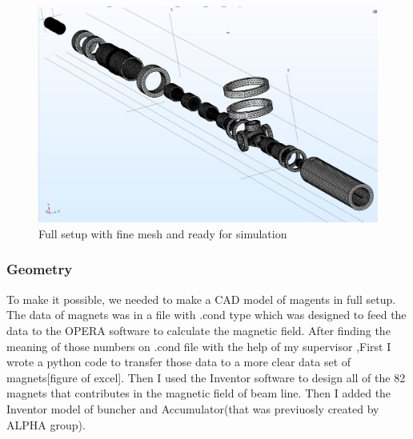 \documentclass[12pt,a4paper]{article}
\begin{document}
\begin{figure}[h]
\centering
\includegraphics[scale=0.4]{full-mesh}
\caption{Full setup with fine mesh and ready for simulation}
\end{figure}

\subsubsection{Geometry}
To make it possible, we needed to make a CAD model of magents in full setup. The data of magnets was in a file with .cond type which was designed to feed the data to the OPERA software to calculate the magnetic field. After finding the meaning of those numbers on .cond file with the help of my supervisor ,First I wrote a python code to transfer those data to a more clear data set of magnets[figure of excel]. Then I used the Inventor software to design all of the 82 magnets that contributes in the magnetic field of beam line. Then I added the Inventor model of buncher and Accumulator(that was previuosly created by ALPHA group).
\end{document}
